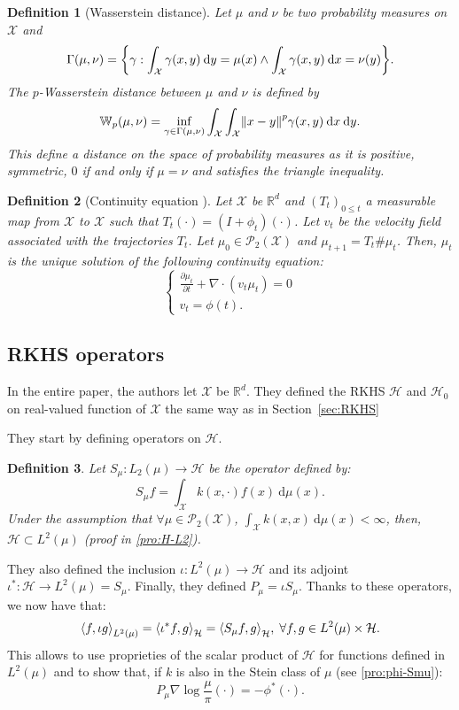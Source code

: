 \documentclass{article}
\newcommand{\R}{\mathbb{R}}
\newcommand{\X}{\mathcal{X}}
\renewcommand{\P}{\mathcal{P}}
\newcommand{\W}{\mathbb{W}}
\renewcommand{\H}{\mathcal{H}}
\newcommand{\diff}[2]{\frac{\partial #1}{\partial #2}}
\renewcommand{\d}{\: \mathrm{d}}
\DeclarePairedDelimiter{\norm}{\|}{\|}
\DeclarePairedDelimiter{\bra}{\{}{\}}
\DeclarePairedDelimiter{\sca}{\langle}{\rangle}
\newtheorem{definition}{Definition}
\begin{document}
\begin{definition}[Wasserstein distance]
  Let $\mu$ and $\nu$ be two probability measures on $\X$ and
  $$
    \Gamma (\mu, \nu) = \bra*{\gamma : \int_\X \gamma(x, y) \d y = \mu(x)
    \land \int_\X \gamma(x, y) \d x = \nu(y)}.
  $$
  The $p$-Wasserstein distance between $\mu$ and $\nu$ is defined by
  $$
    \W_p(\mu, \nu) = \inf_{\gamma \in \Gamma(\mu, \nu)} \int_\X \int_\X
    \norm*{x-y}^p \gamma(x, y) \d x \d y.
  $$
  This define a distance on the space of probability measures as it is
  positive, symmetric, $0$ if and only if $\mu = \nu$ and satisfies
  the triangle inequality.
\end{definition}

\begin{definition}[Continuity equation \cite{villani2003}]\label{def:continuity-equation}
  Let $\X$ be $\R^d$ and $(T_t)_{0 \leq t}$ a measurable map from $\X$ to $\X$
  such that $T_t(\cdot) = (I + \phi_t)(\cdot)$.
  Let $v_t$ be the velocity field associated 
  with the trajectories $T_t$. Let $\mu_0 \in \P_2(\X)$
  and $\mu_{t+1} = T_t \# \mu_t$. Then, $\mu_t$ is the unique solution
  of the following continuity equation:
  $$
  \begin{cases}
    \diff{\mu_t}{t} + \nabla \cdot (v_t \mu_t) = 0 \\
    v_t = \phi(t).
  \end{cases}
  $$
  
\end{definition}

\subsection{RKHS operators}
In the entire paper, the authors let $\X$ be $\R^d$. They defined
the RKHS $\H$ and $\H_0$ on real-valued function of $\X$ the same way as in
Section~\ref{sec:RKHS}

\noindent
They start by defining operators on $\H$.
\begin{definition}
  Let $S_\mu : L_2(\mu) \to \H$ be the operator defined by:
  $$
  S_\mu f = \int_\X k(x, \cdot) f(x) \d \mu(x).
  $$
  Under the assumption that $\forall \mu \in \P_2(\X)$, $\int_\X k(x, x) \d \mu(x) < \infty$,
  then, $\H \subset L^2(\mu)$
  (proof in \ref{pro:H-L2}).
\label{def:S-mu}
\end{definition}
They also defined the inclusion $\iota : L^2(\mu) \to \H$ and
its adjoint $\iota^* : \H \to L^2(\mu) = S_\mu$. Finally, they defined
$P_\mu = \iota S_\mu$. Thanks to these operators, we now have that:
$$
\sca*{f, \iota g}_{L^2(\mu)} = \sca*{\iota^* f, g}_\H = \sca*{S_\mu f, g}_\H,
\; \forall f, g \in L^2(\mu) \times \H.
$$
This allows to use proprieties of the scalar product of $\H$ for functions
defined in $L^2(\mu)$ and to show that, if $k$ is also in the Stein class
of $\mu$ (see \ref{pro:phi-Smu}):
\begin{equation}
    P_\mu \nabla \log \frac{\mu}{\pi}(\cdot) = -\phi^*(\cdot).
    \label{eq:phi-Smu}
\end{equation}
\end{document}
